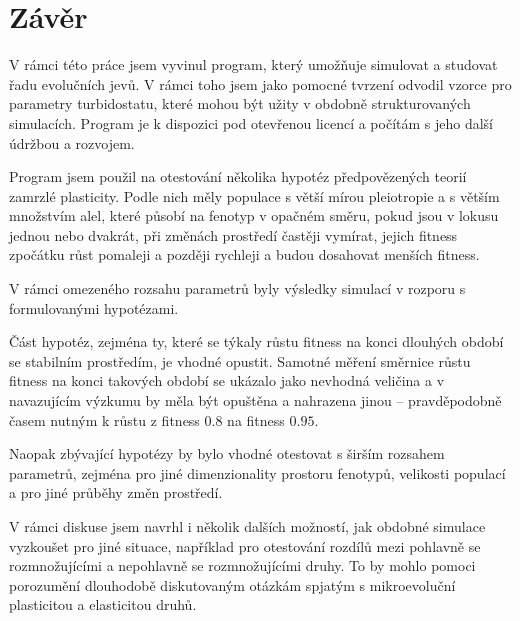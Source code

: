 \chapter*{Závěr}



V rámci této práce jsem vyvinul program, který umožňuje simulovat a studovat řadu evolučních jevů. V rámci toho jsem
jako pomocné tvrzení odvodil vzorce pro parametry turbidostatu, které mohou být užity v obdobně strukturovaných
simulacích. Program je k dispozici pod otevřenou licencí a počítám s jeho další údržbou a rozvojem.

Program jsem použil na otestování několika hypotéz předpovězených teorií zamrzlé plasticity. Podle nich měly populace
s větší mírou pleiotropie a s větším množstvím alel, které působí na fenotyp v opačném směru, pokud jsou v lokusu
jednou nebo dvakrát, při změnách prostředí častěji vymírat, jejich fitness zpočátku růst pomaleji a později rychleji
a budou dosahovat menších fitness.

V rámci omezeného rozsahu parametrů byly výsledky simulací v rozporu s formulovanými hypotézami.

Část hypotéz, zejména ty, které se týkaly růstu fitness na konci dlouhých období se stabilním prostředím,
je vhodné opustit. Samotné měření směrnice růstu fitness na konci takových období se ukázalo jako nevhodná veličina a
v navazujícím výzkumu by měla být opuštěna a nahrazena jinou -- pravděpodobně časem nutným k růstu z
fitness $0.8$ na fitness $0.95$.

Naopak zbývající hypotézy by bylo vhodné otestovat s širším rozsahem parametrů, zejména
pro jiné dimenzionality prostoru fenotypů, velikosti populací a pro jiné průběhy změn prostředí.

V rámci diskuse jsem navrhl i několik dalších možností, jak obdobné simulace vyzkoušet pro jiné situace, například pro
otestování rozdílů mezi pohlavně se rozmnožujícími a nepohlavně se rozmnožujícími druhy. To by mohlo pomoci porozumění
dlouhodobě diskutovaným otázkám spjatým s mikroevoluční plasticitou a elasticitou druhů.
